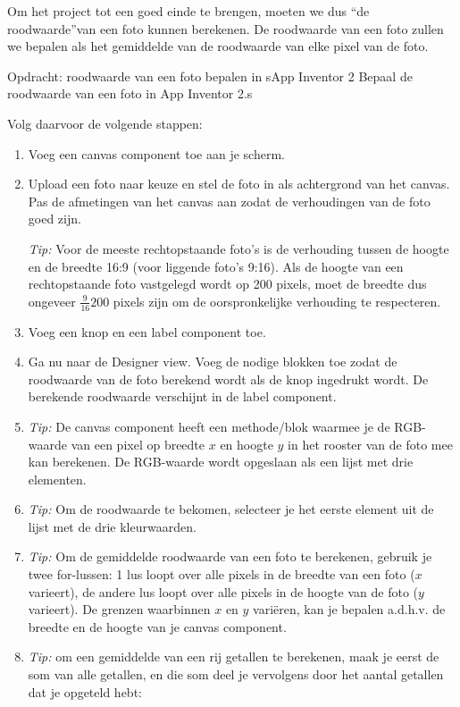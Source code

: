 Om het project tot een goed einde te brengen, moeten we dus \textquotedblleft de roodwaarde\textquotedblright van een foto kunnen berekenen. 
De roodwaarde van een foto zullen we bepalen als het gemiddelde van de roodwaarde van elke pixel van de foto.


\begin{opdracht}{Opdracht: roodwaarde van een foto bepalen in sApp Inventor 2}
Bepaal de roodwaarde van een foto in App Inventor 2.s

Volg daarvoor de volgende stappen:
\begin{enumerate}
	\item Voeg een canvas component toe aan je scherm. 
	\item Upload een foto naar keuze en stel de foto in als achtergrond van het canvas.
	Pas de afmetingen van het canvas aan zodat de verhoudingen van de foto goed zijn. 
	
	\emph{Tip:} Voor de meeste rechtopstaande foto's is de verhouding tussen de hoogte en de breedte 16:9 (voor liggende foto's 9:16). Als de hoogte van een rechtopstaande foto vastgelegd wordt op 200 pixels, moet de breedte dus ongeveer $\frac{9}{16}200$ pixels zijn om de oorspronkelijke verhouding te respecteren.
	 
	\item Voeg een knop en een label component toe.
	
	\item Ga nu naar de Designer view. Voeg de nodige blokken toe zodat de roodwaarde van de foto berekend wordt als de knop ingedrukt wordt. De berekende roodwaarde verschijnt in de label component.
	
	\item \emph{Tip:} De canvas component heeft een methode/blok waarmee je de RGB-waarde van een pixel op breedte $x$ en hoogte $y$ in het rooster van de foto mee kan berekenen. De RGB-waarde wordt opgeslaan als een lijst met drie elementen.
	\item \emph{Tip:} Om de roodwaarde te bekomen, selecteer je het eerste element uit de lijst met de drie kleurwaarden.
	\item \emph{Tip:} Om de gemiddelde roodwaarde van een foto te berekenen, gebruik je twee for-lussen: 1 lus loopt over alle pixels in de breedte van een foto ($x$ varieert), de andere lus loopt over alle pixels in de hoogte van de foto ($y$ varieert). De grenzen waarbinnen $x$ en $y$ vari\"eren, kan je bepalen a.d.h.v. de breedte en de hoogte van je canvas component.
	\item \emph{Tip:} om een gemiddelde van een rij getallen te berekenen, maak je eerst de som van alle getallen, en die som deel je vervolgens door het aantal getallen dat je opgeteld hebt:
	

\end{enumerate}
\end{opdracht}
